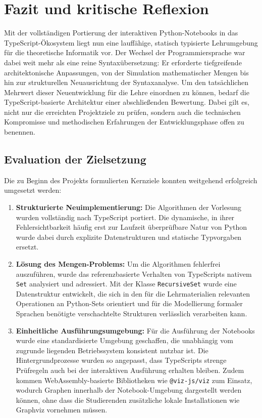 \section{Fazit und kritische Reflexion}
\label{sec:fazit}

Mit der vollständigen Portierung der interaktiven Python-Note\-books in das Type\-Script-Öko\-system liegt nun eine lauffähige, statisch typisierte Lehrumgebung für die theoretische Informatik vor. Der Wechsel der Programmiersprache war dabei weit mehr als eine reine Syntax\-übersetzung: Er erforderte tiefgreifende architektonische Anpassungen, von der Simulation mathematischer Mengen bis hin zur strukturellen Neuausrichtung der Syntaxanalyse. Um den tatsächlichen Mehrwert dieser Neuentwicklung für die Lehre einordnen zu können, bedarf die TypeScript-basierte Architektur einer abschließenden Bewertung. Dabei gilt es, nicht nur die erreichten Projektziele zu prüfen, sondern auch die technischen Kompromisse und methodischen Erfahrungen der Entwicklungsphase offen zu benennen.

\subsection{Evaluation der Zielsetzung}

Die zu Beginn des Projekts formulierten Kernziele konnten weitgehend erfolgreich umgesetzt werden:

\begin{enumerate}
    \item \textbf{Strukturierte Neuimplementierung:}  
    Die Algorithmen der Vorlesung wurden vollständig nach TypeScript portiert. Die dynamische, in ihrer Fehlersichtbarkeit häufig erst zur Laufzeit überprüfbare Natur von Python wurde dabei durch explizite Datenstrukturen und statische Typvorgaben ersetzt.

    \item \textbf{Lösung des Mengen-Problems:}  
    Um die Algorithmen fehlerfrei auszuführen, wurde das referenzbasierte Verhalten von TypeScripts nativem \texttt{Set} analysiert und adressiert. Mit der Klasse \texttt{RecursiveSet} wurde eine Datenstruktur entwickelt, die sich in den für die Lehrmaterialien relevanten Operationen an Python-Sets orientiert und für die Modellierung formaler Sprachen benötigte verschachtelte Strukturen verlässlich verarbeiten kann.

    \item \textbf{Einheitliche Ausführungsumgebung:}  
    Für die Ausführung der Notebooks wurde eine standardisierte Umgebung geschaffen, die unabhängig vom zugrunde liegenden Betriebssystem konsistent nutzbar ist. Die Hintergrundprozesse wurden so angepasst, dass TypeScripts strenge Prüfregeln auch bei der interaktiven Ausführung erhalten bleiben. Zudem kommen WebAssembly-basierte Bibliotheken wie \texttt{@viz-js/viz} zum Einsatz, wodurch Graphen innerhalb der Notebook-Umgebung dargestellt werden können, ohne dass die Studierenden zusätzliche lokale Installationen wie Graphviz vornehmen müssen.
\end{enumerate}

